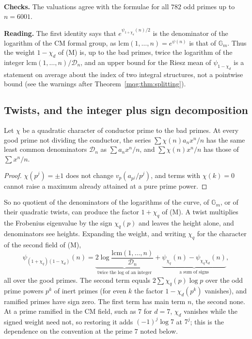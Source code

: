 \textbf{Checks.} The valuations agree with the formulae for all $782$ odd primes up to $n=6001$.

\textbf{Reading.} The first identity says that $e^{\psi_{1+\chi_d}(n)/2}$ is the denominator of the logarithm of the CM formal group, as $\mathrm{lcm}(1,\dots,n)=e^{\psi(n)}$ is that of $\mathbb G_m$. Thus the weight $1-\chi_d$ of (M) is, up to the bad primes, twice the logarithm of the integer $\mathrm{lcm}(1,\dots,n)/\mathcal D_n$, and an upper bound for the Riesz mean of $\psi_{1-\chi_d}$ is a statement on average about the index of two integral structures, not a pointwise bound (see the warnings after Theorem~\ref{mqg:thm:splitting}).

\subsection{Twists, and the integer plus sign decomposition}\label{mqg:sec:twist}

\begin{proposition}\label{mqg:prop:twist}
Let $\chi$ be a quadratic character of conductor prime to the bad primes. At every good prime not dividing the conductor, the series $\sum\chi(n)a_nx^n/n$ has the same least common denominators $\mathcal D_n$ as $\sum a_nx^n/n$, and $\sum\chi(n)x^n/n$ has those of $\sum x^n/n$.
\end{proposition}

\begin{proof}
$\chi(p^j)=\pm1$ does not change $v_p(a_{p^j}/p^j)$, and terms with $\chi(k)=0$ cannot raise a maximum already attained at a pure prime power.
\end{proof}

So no quotient of the denominators of the logarithms of the curve, of $\mathbb G_m$, or of their quadratic twists, can produce the factor $1+\chi_q$ of (M). A twist multiplies the Frobenius eigenvalue by the sign $\chi_q(p)$ and leaves the height alone, and denominators see heights. Expanding the weight, and writing $\chi_q$ for the character of the second field of (M),
\begin{equation}\label{mqg:eq:split}
\psi_{(1+\chi_q)(1-\chi_d)}(n)=\underbrace{2\log\frac{\mathrm{lcm}(1,\dots,n)}{\mathcal D_n}}_{\text{twice the log of an integer}}+\underbrace{\psi_{\chi_q}(n)-\psi_{\chi_q\chi_d}(n)}_{\text{a sum of signs}},
\end{equation}
all over the good primes. The second term equals $2\sum\chi_q(p)\log p$ over the odd prime powers $p^k$ of inert primes (for even $k$ the factor $1-\chi_d(p^k)$ vanishes), and ramified primes have sign zero. The first term has main term $n$, the second none. At a prime ramified in the CM field, such as $7$ for $d=7$, $\chi_d$ vanishes while the signed weight need not, so restoring it adds $(-1)^j\log7$ at $7^j$; this is the dependence on the convention at the prime $7$ noted below.

